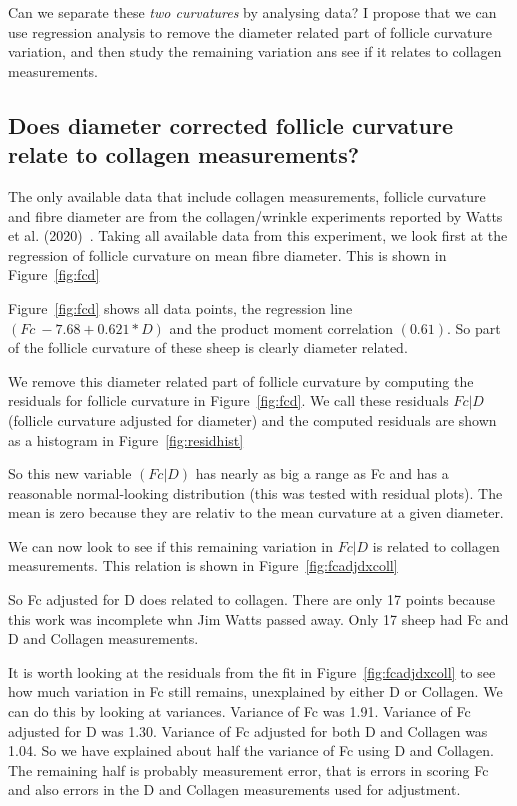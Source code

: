\documentclass{article}
\begin{document}
Can we separate these {\em two curvatures} by analysing data?  I propose that we can use regression analysis to remove the diameter related part of follicle curvature variation, and then study the remaining variation ans see if it relates to collagen measurements.

\subsection{ Does diameter corrected follicle curvature relate to collagen measurements?}
The only available data that include collagen measurements, follicle curvature and fibre diameter are  from the collagen/wrinkle experiments reported by Watts et al. (2020)~\cite{watts-2020}. Taking all available data from this experiment, we look first at the regression of follicle curvature on mean fibre diameter. This is shown in Figure~\ref{fig:fcd}

Figure~\ref{fig:fcd} shows all data points, the regression line $(Fc ~  -7.68   + 0.621 * D)$ and the product moment correlation $(0.61)$. So part of the follicle curvature of these sheep is clearly diameter related. 

We remove this diameter related part of follicle curvature by computing the residuals for follicle curvature in Figure~\ref{fig:fcd}. We call these residuals $Fc | D$ (follicle curvature adjusted for diameter) and the computed residuals are shown as a histogram in Figure~\ref{fig:residhist}

So this new variable $(Fc | D)$ has nearly as big a range as Fc and has a reasonable normal-looking distribution (this was tested with residual plots). The mean is zero because they are relativ to the mean curvature at a given diameter.

We can now look to see if this remaining variation in $Fc | D$ is related to collagen measurements. This relation is shown in Figure~\ref{fig:fcadjdxcoll}

So Fc adjusted for D does related to collagen. There are only 17 points because this work was incomplete whn Jim Watts passed away. Only 17 sheep had Fc and D and Collagen measurements.

It is worth looking at the residuals from the fit in Figure~\ref{fig:fcadjdxcoll} to see how much variation in Fc still remains, unexplained by either D or Collagen.  We can do this by looking at variances. Variance of Fc was 1.91. Variance of Fc adjusted for D was 1.30. Variance of Fc adjusted for both D and Collagen was 1.04. So we have explained about half the variance of Fc using D and Collagen. The remaining half is probably measurement error, that is errors in scoring Fc and also errors in the D and Collagen measurements used for adjustment.
\end{document}

